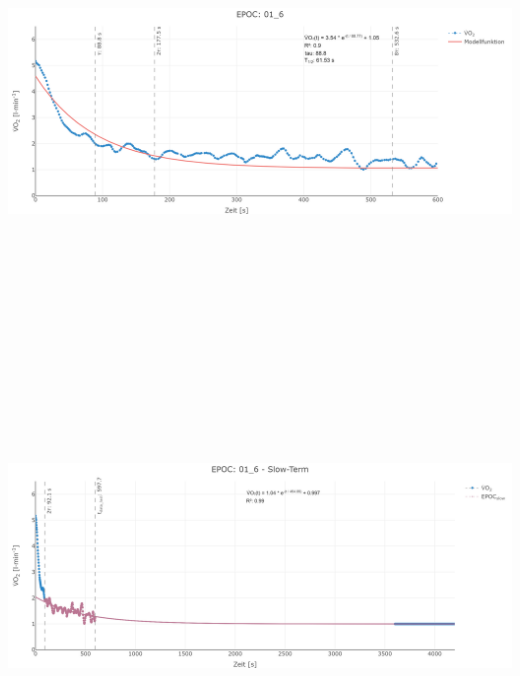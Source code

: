 \documentclass[
  letterpaper,
  DIV=11]{scrartcl}
\begin{document}
\includegraphics[width=11.45833in,height=4.6875in]{images/01_6_tau.png}
\includegraphics[width=11.45833in,height=4.6875in]{images/01_6_slow.png}
\end{document}
